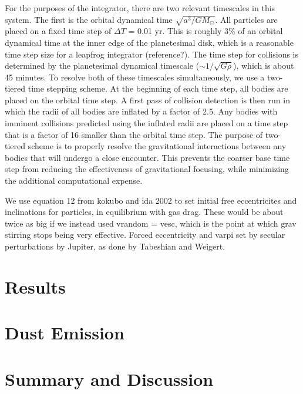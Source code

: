 \documentclass[twocolumn]{aastex62}
\begin{document}
For the purposes of the integrator, there are two relevant timescales in this system. The first is the orbital dynamical time $\sqrt{a^3/G M_{\odot}}$. All particles are placed on a fixed time step of $\Delta T$ = 0.01 yr. This is roughly 3\% of an orbital dynamical time at the inner edge of the planetesimal disk, which is a reasonable time step size for a leapfrog integrator (reference?). The time step for collisions is determined by the planetesimal dynamical timescale ($\sim 1/\sqrt{G \rho}$), which is about 45 minutes. To resolve both of these timescales simultaneously, we use a two-tiered time stepping scheme. At the beginning of each time step, all bodies are placed on the orbital time step. A first pass of collision detection is then run in which the radii of all bodies are inflated by a factor of 2.5. Any bodies with imminent collisions predicted using the inflated radii are placed on a time step that is a factor of 16 smaller than the orbital time step. The purpose of two-tiered scheme is to properly resolve the gravitational interactions between any bodies that will undergo a close encounter. This prevents the coarser base time step from reducing the effectiveness of gravitational focusing, while minimizing the additional computational expense.

We use equation 12 from kokubo and ida 2002 to set initial free eccentricites and inclinations for particles, in equilibrium with gas drag. These would be about twice as big if we instead used vrandom = vesc, which is the point at which grav stirring stops being very effective. Forced eccentricity and varpi set by secular perturbations by Jupiter, as done by Tabeshian and Weigert.

\section{Results} \label{sec:results}

\section{Dust Emission} \label{sec:dust}

\section{Summary and Discussion} \label{sec:discuss}
\end{document}
